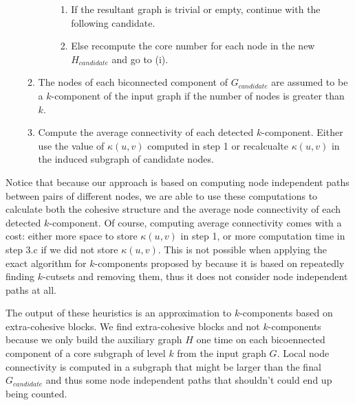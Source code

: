 \begin{enumerate}
\begin{enumerate}
\begin{enumerate}
\begin{enumerate}

\item If the resultant graph is trivial or empty, continue with the following candidate.

\item Else recompute the core number for each node in the new $H_{candidate}$ and go to (i).

\end{enumerate}


\end{enumerate}

\item The nodes of each biconnected component of $G_{candidate}$ are assumed to be a $k$-component of the input graph if the number of nodes is greater than $k$.

\item Compute the average connectivity of each detected $k$-component. Either use the value of $\kappa(u,v)$ computed in step 1 or recalcualte $\kappa(u,v)$ in the induced subgraph of candidate nodes.

\end{enumerate}

\end{enumerate}

Notice that because our approach is based on computing node independent paths between pairs of different nodes, we are able to use these computations to calculate both the cohesive structure and the average node connectivity of each detected $k$-component. Of course, computing average connectivity comes with a cost: either more space to store $\kappa(u,v)$ in step 1, or more computation time in step 3.c if we did not store $\kappa(u,v)$. This is not possible when applying the exact algorithm for $k$-components proposed by \citet{moody:2003} because it is based on repeatedly finding $k$-cutsets and removing them, thus it does not consider node independent paths at all.

The output of these heuristics is an approximation to $k$-components based on extra-cohesive blocks. We find extra-cohesive blocks and not $k$-components because we only build the auxiliary graph $H$ one time on each bicoennected component of a core subgraph of level $k$ from the input graph $G$. Local node connectivity is computed in a subgraph that might be larger than the final $G_{candidate}$ and thus some node independent paths that shouldn't could end up being counted. 

